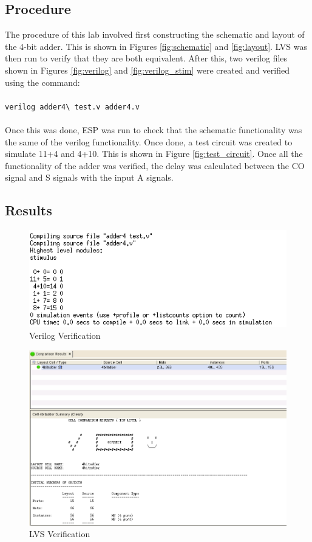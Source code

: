 \documentclass[12pt]{article}
\begin{document}
\subsection{Procedure}
The procedure of this lab involved first constructing the schematic and layout of the 4-bit adder. This is shown in Figures \ref{fig:schematic} and \ref{fig:layout}. LVS was then run to verify that they are both equivalent. After this, two verilog files shown in Figures \ref{fig:verilog} and \ref{fig:verilog_stim} were created and verified using the command: \\ ~\\ \texttt{verilog adder4\textbackslash\  test.v adder4.v} \\ ~\\
Once this was done, ESP was run to check that the schematic functionality was the same of the verilog functionality. Once done, a test circuit was created to simulate 11+4 and 4+10. This is shown in Figure \ref{fig:test_circuit}. Once all the functionality of the adder was verified, the delay was calculated between the CO signal and S signals with the input A signals.
\subsection{Results}
\begin{figure}[H]
\centering
\includegraphics[width=0.7\linewidth]{verilog_verification}
\caption{Verilog Verification}
\label{fig:verilog_verification}
\end{figure}

\begin{figure}[H]
\centering
\includegraphics[width=0.7\linewidth]{LVS}
\caption{LVS Verification}
\label{fig:LVS}
\end{figure}
\end{document}
